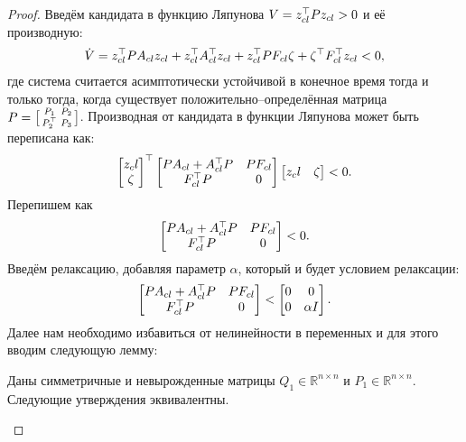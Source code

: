 \begin{proof}
	Введём кандидата в функцию Ляпунова ${V} = {z}_{cl}^\top {P}{z}_{cl} > 0$ и её производную:
	\begin{align}
		{\dot{V}} = {z}_{cl}^\top {P} {A}_{cl} {z}_{cl} +
		{z}_{cl}^\top {A}_{cl}^\top {z}_{cl} 
		+
		{z}_{cl}^\top {P} {F}_{cl} {\zeta} +
		{\zeta}^\top {F}_{cl}^\top {z}_{cl}
		< 0,
	\end{align}
	где система считается асимптотически устойчивой в конечное время тогда и только тогда, когда существует положительно--определённая матрица ${P} = \bigl[ \begin{smallmatrix}  {P}_1 & {P}_2 \\ {P}_2^\top & {P}_3 \end{smallmatrix} \bigr]$.
	Производная от кандидата в функции Ляпунова может быть переписана как:
		\begin{align}
			\begin{bmatrix}
				z_cl \\ \zeta
			\end{bmatrix}^\top
		\begin{bmatrix}
			{P} {A}_{cl} + {A}_{cl}^\top {P} & {P} {F}_{cl} \\
			{F}_{cl} ^\top {P} & 0
		\end{bmatrix} 
		\begin{bmatrix}
			z_cl & \zeta
		\end{bmatrix} < 0.
	\end{align}
	Перепишем как
	\begin{align}
		\begin{bmatrix}
			{P} {A}_{cl} + {A}_{cl}^\top {P} & {P} {F}_{cl} \\
			{F}_{cl} ^\top {P} & 0
		\end{bmatrix} < 0.
	\end{align}
	Введём релаксацию, добавляя параметр $\alpha$, который и будет условием релаксации:
	\begin{align}\label{eq: S procedure}
		\begin{bmatrix}
			{P} {A}_{cl} + {A}_{cl}^\top {P} & {P} {F}_{cl} \\
			{F}_{cl} ^\top {P} & 0
		\end{bmatrix} < 
		\begin{bmatrix}
			0 & 0\\
			0 & \alpha {I}
		\end{bmatrix}.
	\end{align}
	Далее нам необходимо избавиться от нелинейности в переменных и для этого вводим следующую лемму:
	\begin{lemma}
		Даны симметричные и невырожденные матрицы ${Q}_{1} \in \mathbb{R}^{n\times n}$ и ${P}_{1} \in \mathbb{R}^{n\times n}$. Следующие утверждения эквивалентны.\\
		

\end{lemma}
\end{proof}

